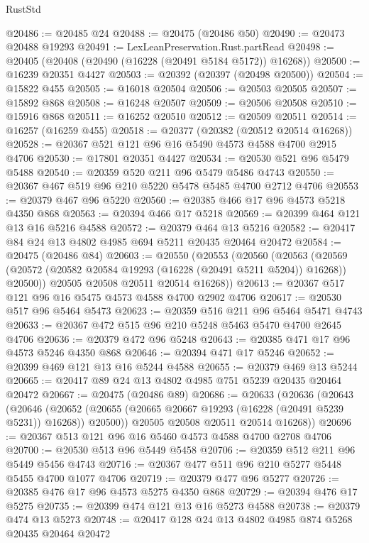 \begin{lexlean}{RustStd}
\begin{coremodule}
@20486 := @20485 @24
@20488 := @20475 (@20486 @50)
@20490 := @20473 @20488 @19293
@20491 := LexLeanPreservation.Rust.partRead
@20498 := @20405 (@20408 (@20490 (@16228 (@20491 @5184 @5172)) @16268))
@20500 := @16239 @20351 @4427
@20503 := @20392 (@20397 (@20498 @20500))
@20504 := @15822 @455
@20505 := @16018 @20504
@20506 := @20503 @20505
@20507 := @15892 @868
@20508 := @16248 @20507
@20509 := @20506 @20508
@20510 := @15916 @868
@20511 := @16252 @20510
@20512 := @20509 @20511
@20514 := @16257 (@16259 @455)
@20518 := @20377 (@20382 (@20512 @20514 @16268))
@20528 := @20367 @521 @121 @96 @16 @5490 @4573 @4588 @4700 @2915 @4706
@20530 := @17801 @20351 @4427
@20534 := @20530 @521 @96 @5479 @5488
@20540 := @20359 @520 @211 @96 @5479 @5486 @4743
@20550 := @20367 @467 @519 @96 @210 @5220 @5478 @5485 @4700 @2712 @4706
@20553 := @20379 @467 @96 @5220
@20560 := @20385 @466 @17 @96 @4573 @5218 @4350 @868
@20563 := @20394 @466 @17 @5218
@20569 := @20399 @464 @121 @13 @16 @5216 @4588
@20572 := @20379 @464 @13 @5216
@20582 := @20417 @84 @24 @13 @4802 @4985 @694 @5211 @20435 @20464 @20472
@20584 := @20475 (@20486 @84)
@20603 := @20550
    (@20553
      (@20560
        (@20563
          (@20569 (@20572 (@20582 @20584 @19293 (@16228 (@20491 @5211 @5204)) @16268)) @20500))
        @20505
        @20508
        @20511
        @20514
        @16268))
@20613 := @20367 @517 @121 @96 @16 @5475 @4573 @4588 @4700 @2902 @4706
@20617 := @20530 @517 @96 @5464 @5473
@20623 := @20359 @516 @211 @96 @5464 @5471 @4743
@20633 := @20367 @472 @515 @96 @210 @5248 @5463 @5470 @4700 @2645 @4706
@20636 := @20379 @472 @96 @5248
@20643 := @20385 @471 @17 @96 @4573 @5246 @4350 @868
@20646 := @20394 @471 @17 @5246
@20652 := @20399 @469 @121 @13 @16 @5244 @4588
@20655 := @20379 @469 @13 @5244
@20665 := @20417 @89 @24 @13 @4802 @4985 @751 @5239 @20435 @20464 @20472
@20667 := @20475 (@20486 @89)
@20686 := @20633
    (@20636
      (@20643
        (@20646
          (@20652 (@20655 (@20665 @20667 @19293 (@16228 (@20491 @5239 @5231)) @16268)) @20500))
        @20505
        @20508
        @20511
        @20514
        @16268))
@20696 := @20367 @513 @121 @96 @16 @5460 @4573 @4588 @4700 @2708 @4706
@20700 := @20530 @513 @96 @5449 @5458
@20706 := @20359 @512 @211 @96 @5449 @5456 @4743
@20716 := @20367 @477 @511 @96 @210 @5277 @5448 @5455 @4700 @1077 @4706
@20719 := @20379 @477 @96 @5277
@20726 := @20385 @476 @17 @96 @4573 @5275 @4350 @868
@20729 := @20394 @476 @17 @5275
@20735 := @20399 @474 @121 @13 @16 @5273 @4588
@20738 := @20379 @474 @13 @5273
@20748 := @20417 @128 @24 @13 @4802 @4985 @874 @5268 @20435 @20464 @20472

\end{coremodule}
\end{lexlean}

